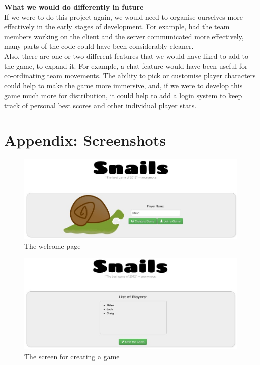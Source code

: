 \documentclass{article}
\begin{document}
\textbf{What we would do differently in future} \\
If we were to do this project again, we would need to organise ourselves more effectively in the early stages of development. For example, had the team members working on the client and the server communicated more effectively, many parts of the code could have been considerably cleaner. \\
Also, there are one or two different features that we would have liked to add to the game, to expand it. For example, a chat feature would have been useful for co-ordinating team movements. The ability to pick or customise player characters could help to make the game more immersive, and, if we were to develop this game much more for distribution, it could help to add a login system to keep track of personal best scores and other individual player stats.

\section{Appendix: Screenshots}

\begin{figure}[htb]
\centering
\includegraphics[width=1.0\textwidth]{index.jpg}
\caption{The welcome page}
\end{figure}

\begin{figure}[htb]
\centering
\includegraphics[width=1.0\textwidth]{create.jpg}
\caption{The screen for creating a game}
\end{figure}
\end{document}
